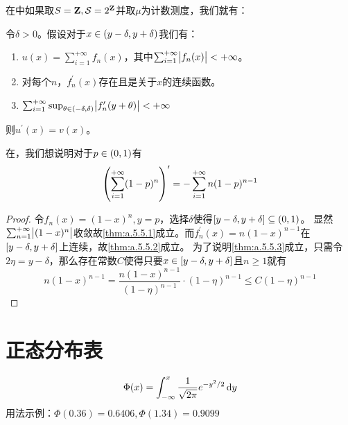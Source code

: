 \documentclass[main.tex]{subfiles}
\begin{document}
在中如果取\(S=\mathbf{Z}, \mathcal{S}=2^{\mathbf{Z}}\)并取\(\mu\)为计数测度，我们就有：
\begin{theorem}
	令\(\delta > 0\)。假设对于\(x \in \intoo{y-\delta, y+\delta}\)我们有：
	\begin{enumerate}
		\item \label{thm:a.5.5.1} \(u(x) = \sum_{i=1}^{+\infty}f_n(x)\)，其中\(\sum_{i=1}^{+\infty} \envert{f_n(x)} < +\infty\)。
		\item \label{thm:a.5.5.2} 对每个\(n\)，\(f_n^\prime(x)\)存在且是关于\(x\)的连续函数。
		\item \label{thm:a.5.5.3}  \(\sum_{i=1}^{+\infty}\sup_{\theta\in\intoo{-\delta, \delta}} \envert{f_n^\prime(y+\theta)} < +\infty\)
	\end{enumerate}
	则\(u^\prime(x)=v(x)\)。
\end{theorem}
\begin{example}
	在，我们想说明对于\(p\in\intoo{0,1}\)有
	\[\del{\sum_{i=1}^{+\infty}(1-p)^n}^\prime = -\sum_{i=1}^{+\infty}n(1-p)^{n-1}\]
\end{example}
\begin{proof}
	令\(f_n(x) = (1-x)^n, y=p\)，选择\(\delta\)使得\(\intcc{y-\delta, y+\delta} \subseteq \intoo{0,1}\)。
	显然\(\sum_{n=1}^{+\infty} \envert{(1-x)^n}\)收敛故\ref{thm:a.5.5.1}成立。而\(f_n^\prime(x) = n(1-x)^{n-1}\)在\(\intcc{y-\delta, y+\delta}\)上连续，故\ref{thm:a.5.5.2}成立。
	为了说明\ref{thm:a.5.5.3}成立，只需令\(2\eta = y-\delta\)，那么存在常数\(C\)使得只要\(x\in\intcc{y-\delta, y+\delta}\)且\(n\geq 1\)就有
	\[n(1-x)^{n-1} = \frac{n(1-x)^{n-1}}{(1-\eta)^{n-1}}\cdot (1-\eta)^{n-1}\leq C(1-\eta)^{n-1}\]
\end{proof}
\section*{正态分布表}
\[\Phi(x) = \int_{-\infty}^{x}\frac{1}{\sqrt{2\pi}}e^{-y^2/2} \dif y\]
用法示例：\(\Phi(0.36)=0.6406, \Phi(1.34)=0.9099\)
%
\end{document}
